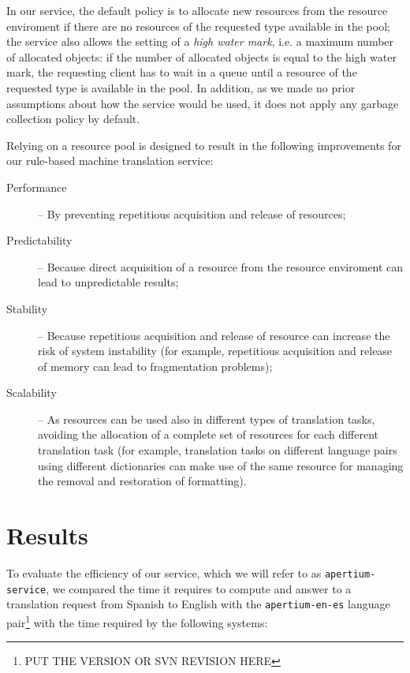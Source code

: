 \documentclass[11pt]{article}
\begin{document}
In our service, the default policy is to allocate new resources from the resource enviroment if 
there are no resources of the requested type available in the pool; the service also allows the 
setting of a \emph{high water mark}, i.e. a maximum number of allocated objects: if the number of 
allocated objects is equal to the high water mark, the requesting client has to wait in a queue 
until a resource of the requested type is available in the pool. In addition, as we made no prior 
assumptions about how the service would be used, it does not apply any garbage collection policy 
by default.

Relying on a resource pool is designed to result in the following improvements for our 
rule-based machine translation service:

\begin{description}
 \item[Performance] -- By preventing repetitious acquisition and release of resources;
 \item[Predictability] -- Because direct acquisition of a resource from the resource 
        enviroment can lead to unpredictable results;
 \item[Stability] -- Because repetitious acquisition and release of resource can 
        increase the risk of system instability (for example, repetitious acquisition and 
        release of memory can lead to fragmentation problems); %
 \item[Scalability] -- As resources can be used also in different types of translation tasks, 
        avoiding the allocation of a complete set of resources for each different translation 
        task (for example, translation tasks on different language pairs using different 
        dictionaries can make use of the same resource for managing the removal and restoration 
        of formatting).
\end{description}

\section{Results}

To evaluate the efficiency of our service, which we will refer to as {\tt apertium-service}, we 
compared the time it requires to compute and answer to a translation request from Spanish 
to English with the {\tt\small apertium-en-es} language pair\footnote{PUT THE VERSION OR SVN 
REVISION HERE} with the time required by the following systems:
\end{document}
